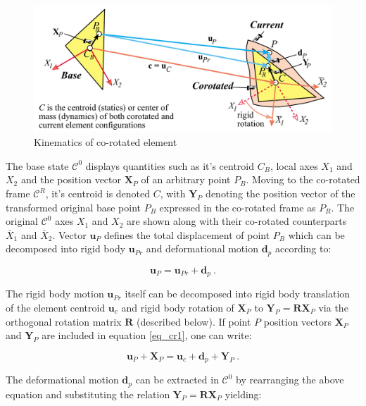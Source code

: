 \begin{figure}[H]
	\centering
	\def\svgwidth{\columnwidth}
	\includegraphics[width=14cm]{images/cr_4.png}
	\caption{Kinematics of co-rotated element \cite{felippa2000systematic}}
	\label{cr4}
\end{figure}

The base state $\mathscr{C}^0$ displays quantities such as it's centroid $C_B$, local axes $X_1$ and $X_2$ and the position vector $\mathbf{X}_P$ of an arbitrary point $P_B$. Moving to the co-rotated frame $\mathscr{C}^R$, it's centroid is denoted $C$, with $\mathbf{Y}_P$ denoting the position vector of the transformed original base point $P_B$ expressed in the co-rotated frame as $P_R$. The original $\mathscr{C}^0$ axes $X_1$ and $X_2$ are shown along with their co-rotated counterparts $\bar{X}_1$ and $\bar{X}_2$. Vector $\mathbf{u}_P$ defines the total displacement of point $P_B$ which can be decomposed into rigid body $\mathbf{u}_{Pr}$ and deformational motion $\mathbf{d}_p$ according to:

\begin{equation} 
\mathbf{u}_P = 
\mathbf{u}_{Pr} + \mathbf{d}_p
\label{eq_cr1}\ .
\end{equation}

The rigid body motion $\mathbf{u}_{Pr}$ itself can be decomposed into rigid body translation of the element centroid $\mathbf{u}_c$ and rigid body rotation of $\mathbf{X}_P$ to $\mathbf{Y}_P = \mathbf{R} \mathbf{X}_P$ via the orthogonal rotation matrix $\mathbf{R}$ (described below). If point $P$ position vectors $\mathbf{X}_P$ and $\mathbf{Y}_P$ are included in equation \ref{eq_cr1}, one can write:

\begin{equation} 
\mathbf{u}_P + \mathbf{X}_P = 
\mathbf{u}_{c} + \mathbf{d}_p + \mathbf{Y}_P
\label{eq_cr2}\ .
\end{equation}

The deformational motion $\mathbf{d}_p$ can be extracted in $\mathscr{C}^0$ by rearranging the above equation and substituting the relation $\mathbf{Y}_P = \mathbf{R} \mathbf{X}_P$ yielding:

